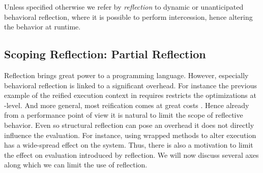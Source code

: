 \noindent Unless specified otherwise we refer by \emph{reflection} to dynamic or unanticipated behavioral reflection, where it is possible to perform intercession, hence altering the behavior at runtime.

\subsection{Scoping Reflection: Partial Reflection}
Reflection brings great power to a programming language.
However, especially behavioral reflection is linked to a significant overhead.
For instance the previous example of the reified execution context in \ST requires restricts the optimizations at \VM-level.
And more general, most reification comes at great costs \cite{Male96a}.
Hence already from a performance point of view it is natural to limit the scope of reflective behavior.
Even so structural reflection can pose an overhead it does not directly influence the evaluation.
For instance, using wrapped methods to alter execution has a wide-spread effect on the system.
Thus, there is also a motivation to limit the effect on evaluation introduced by reflection.
We will now discuss several axes along which we can limit the use of reflection.
%
